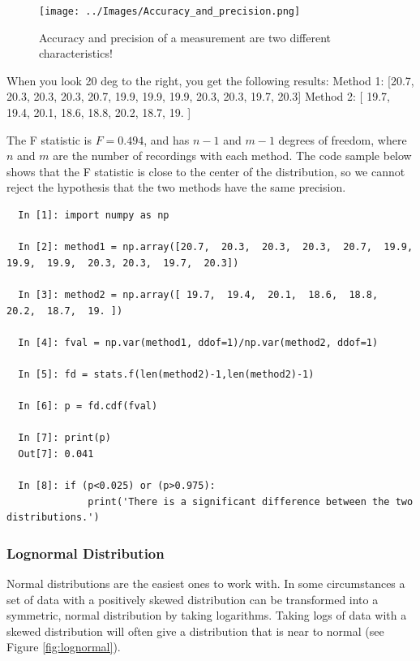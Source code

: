 \begin{figure}
  \centering
  \texttt{[image: ../Images/Accuracy\_and\_precision.png]}\\
  \caption{Accuracy and precision of a measurement are two different characteristics!}
  \label{fig:accuracy}
\end{figure}

When you look 20 deg to the right, you get the following results:
Method 1: [20.7,  20.3,  20.3,  20.3,  20.7,  19.9,  19.9,  19.9,  20.3,
        20.3,  19.7,  20.3]
Method 2: [ 19.7,  19.4,  20.1,  18.6,  18.8,  20.2,  18.7,  19. ]

The F statistic is $F = 0.494$, and has $n-1$ and $m-1$ degrees of freedom, where $n$ and $m$ are the number of recordings with each method. The code sample below shows that the F statistic is close to the center of the distribution, so we cannot reject the hypothesis that the two methods have the same precision.

\begin{lstlisting}
  In [1]: import numpy as np
  
  In [2]: method1 = np.array([20.7,  20.3,  20.3,  20.3,  20.7,  19.9,  19.9,  19.9,  20.3, 20.3,  19.7,  20.3])
  
  In [3]: method2 = np.array([ 19.7,  19.4,  20.1,  18.6,  18.8,  20.2,  18.7,  19. ])
  
  In [4]: fval = np.var(method1, ddof=1)/np.var(method2, ddof=1)
  
  In [5]: fd = stats.f(len(method2)-1,len(method2)-1)
  
  In [6]: p = fd.cdf(fval)
  
  In [7]: print(p)
  Out[7]: 0.041
  
  In [8]: if (p<0.025) or (p>0.975):
              print('There is a significant difference between the two distributions.')
\end{lstlisting}


\subsubsection{Lognormal Distribution}

Normal distributions are the easiest ones to work with. In some circumstances a set of data with a positively skewed distribution can be transformed into a symmetric, normal distribution by taking logarithms. Taking logs of data with a skewed distribution will often give a distribution that is near to normal (see Figure \ref{fig:lognormal}).

